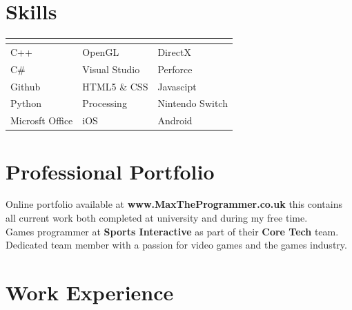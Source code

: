 \documentclass{article}
\begin{document}
	\sffamily
	\fancyhf{}


\newpage
\section*{}
\vspace{-3mm}
\section*{Skills}
\vspace{-6mm}
\begin{tabular}{|  p{} | p{} | p{} |}
\multicolumn{3}{c}{ } \\ \hline  
C++  & OpenGL & DirectX \\ \hline
C\# & Visual Studio & Perforce \\ \hline
Github & HTML5 \& CSS & Javascipt \\ \hline
Python & Processing & Nintendo Switch \\ \hline
Microsft Office & iOS & Android \\ \hline
\end{tabular}
\section*{Professional Portfolio}
Online portfolio available at {\bf \large www.MaxTheProgrammer.co.uk} this contains all current work both completed at university and during my free time. \\
Games programmer at {\bf \large Sports Interactive} as part of their {\bf \large Core Tech} team. Dedicated team member with a passion for video games and the games industry.

\section*{Work Experience }
\end{document}
